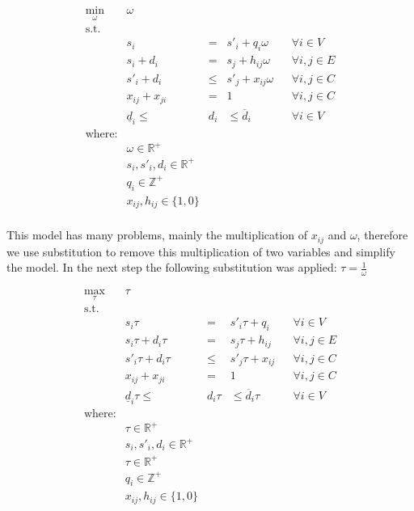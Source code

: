 \documentclass[11pt,twoside,a4paper]{book}
\begin{document}
\begin{equation}
\begin{matrix}
\displaystyle \min_\omega & \omega  \\
\textrm{s.t.} \\
& s_i & = & s'_i + q_i \omega & & \forall i \in V \\
& s_i + d_i & = & s_j + h_{ij} \omega & & \forall i, j \in E \\
& s'_i + d_i & \leq & s'_j + x_{ij} \omega & & \forall i, j \in C \\
& x_{ij} + x_{ji} & = & 1 & & \forall i, j \in C \\
& \underline{d}_i \leq &  d_i & \leq \overline{d}_i & & \forall i \in V \\

\textrm{where:} \\
& \omega \in \mathbb{R}^+\\
& s_i, s'_i, d_i \in \mathbb{R}^+\\
& q_i \in \mathbb{Z}^+\\
& x_{ij}, h_{ij} \in \{1, 0\} \\

\end{matrix}
\end{equation}

This model has many problems, mainly the multiplication of $x_{ij}$ and  $\omega$, therefore we use substitution to remove this multiplication of two variables and simplify the model. In the next step the following substitution was applied: $\tau = \frac{1}{\omega}$

\begin{equation}
\begin{matrix}
\displaystyle \max_\tau & \tau  \\
\textrm{s.t.} \\
& s_i \tau & = & s'_i \tau + q_i & & \forall i \in V \\
& s_i \tau + d_i \tau & = & s_j \tau + h_{ij} & & \forall i, j \in E \\
& s'_i \tau + d_i \tau & \leq & s'_j \tau + x_{ij} & & \forall i, j \in C \\
& x_{ij} + x_{ji} & = & 1 & & \forall i, j \in C \\
& \underline{d}_i \tau \leq &  d_i \tau & \leq \overline{d}_i \tau & & \forall i \in V \\

\textrm{where:} \\
& \tau \in \mathbb{R}^+\\
& s_i, s'_i, d_i \in \mathbb{R}^+\\
& \tau \in \mathbb{R}^+ \\
& q_i \in \mathbb{Z}^+\\
& x_{ij}, h_{ij} \in \{1, 0\} \\

\end{matrix}
\end{equation}
\end{document}
